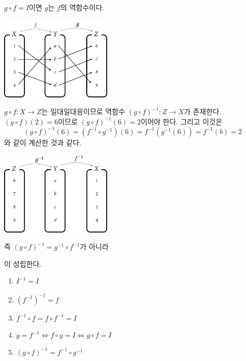 \documentclass{oblivoir}
\begin{document}
%
\label{inverse14}
\begin{center}
\(g\circ f=I\)이면 \(g\)는 \(f\)의 역함수이다.
\end{center}

\newpage
%
\label{inverse15}
\begin{center}
\includegraphics[width=0.4\textwidth]{inverse_15-1}
\end{center}
\(g\circ f:X\to Z\)는 일대일대응이므로 역함수 \((g\circ f)^{-1}:Z\to X\)가 존재한다.
\((g\circ f)(2)=6\)이므로 \((g\circ f)^{-1}(6)=2\)이어야 한다.
그리고 이것은
\[(g\circ f)^{-1}(6)=(f^{-1}\circ g^{-1})(6)=f^{-1}(g^{-1}(6))=f^{-1}(b)=2\]
와 같이 계산한 것과 같다.
\begin{center}
\includegraphics[width=0.4\textwidth]{inverse_15-2}
\end{center}
즉 \((g\circ f)^{-1}=g^{-1}\circ f^{-1}\)가 아니라
\begin{center}
\end{center}
이 성립한다.

\newpage
\begin{mdframed}
%
\begin{enumerate}[label=(\alph*)]\label{inverse16}
\item
\(I^{-1}=I\)
\item
\((f^{-1})^{-1}=f\)
\item
\(f^{-1}\circ f=f\circ f^{-1}=I\)
\item
\(g=f^{-1}\iff f\circ g=I\iff g\circ f=I\)
\item
\((g\circ f)^{-1}=f^{-1}\circ g^{-1}\)
\end{enumerate}
\end{mdframed}
\end{document}
